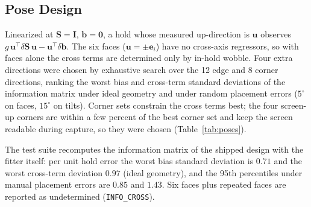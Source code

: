 \documentclass[conference]{IEEEtran}
\begin{document}
    \subsection{Pose Design}

    Linearized at $\mathbf{S}=\mathbf{I}$, $\mathbf{b}=\mathbf{0}$, a hold
    whose measured up-direction is $\mathbf{u}$ observes
    $g\,\mathbf{u}^\top\delta\mathbf{S}\,\mathbf{u} - \mathbf{u}^\top\delta\mathbf{b}$.
    The six faces ($\mathbf{u}=\pm\mathbf{e}_i$) have no cross-axis
    regressors, so with faces alone the cross terms are determined only by
    in-hold wobble. Four extra directions were chosen by exhaustive search
    over the 12 edge and 8 corner directions, ranking the worst bias and
    cross-term standard deviations of the information matrix under ideal
    geometry and under random placement errors ($5^\circ$ on faces,
    $15^\circ$ on tilts). Corner sets constrain the cross terms best; the
    four screen-up corners are within a few percent of the best corner set
    and keep the screen readable during capture, so they were chosen
    (Table~\ref{tab:poses}).

    The test suite recomputes the information matrix of the shipped design
    with the fitter itself: per unit hold error the worst bias standard
    deviation is $0.71$ and the worst cross-term deviation $0.97$
    (ideal geometry), and the 95th percentiles under manual placement
    errors are $0.85$ and $1.43$. Six faces plus repeated faces are
    reported as undetermined (\texttt{INFO\_CROSS}).
\end{document}
